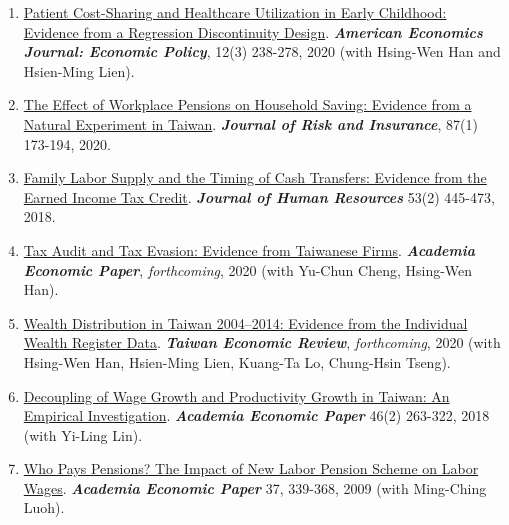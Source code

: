 \documentclass[10pt,letterpaper]{article}
\begin{document}
\begin{enumerate}[resume]

\item \href{https://www.dropbox.com/s/pe5n9a74avtwk6v/Children_copay_v176_parametric.pdf?dl=0}{Patient Cost-Sharing and Healthcare Utilization in Early Childhood: Evidence from a Regression Discontinuity Design}.
\textit{\textbf{American Economics Journal: Economic Policy}}, 12(3) 238-278, 2020 (with Hsing-Wen Han and Hsien-Ming Lien).

\item
\href{https://www.dropbox.com/s/i792d6jutss65b2/Proposal_pension_saving_JRI_v91_final.pdf?dl=0}{The Effect of Workplace Pensions on Household Saving: Evidence from a Natural Experiment in Taiwan}.
\textit{\textbf{Journal of Risk and Insurance}}, 87(1) 173-194, 2020.

\item \href{http://jhr.uwpress.org/content/early/2017/03/01/jhr.53.2.0115-6857R1.abstract}{Family Labor Supply and the Timing of Cash Transfers: Evidence from the Earned Income Tax Credit}.
\textit{\textbf{Journal of Human Resources}} 53(2) 445-473, 2018.

\item
\href{https://www.dropbox.com/s/z5b267cu72o6xlg/tot_wage_v63_olo_revised.pdf?dl=0}{Tax Audit and Tax Evasion: Evidence from Taiwanese Firms}. \textit{\textbf{Academia Economic Paper}}, \textit{forthcoming}, 2020 (with Yu-Chun Cheng, Hsing-Wen Han).

\item
\href{http://www.econ.ntu.edu.tw/ter/new/data/new/forthcoming/108-015.pdf}{Wealth Distribution in Taiwan 2004--2014: Evidence from the Individual Wealth Register Data}. \textit{\textbf{Taiwan Economic Review}}, \textit{forthcoming}, 2020 (with Hsing-Wen Han, Hsien-Ming Lien, Kuang-Ta Lo, Chung-Hsin Tseng).

\item
\href{https://www.dropbox.com/s/z5b267cu72o6xlg/tot_wage_v63_olo_revised.pdf?dl=0}{Decoupling of Wage Growth and Productivity Growth in Taiwan: An Empirical Investigation}. \textit{\textbf{Academia Economic Paper}} 46(2) 263-322, 2018 (with Yi-Ling Lin).

\item \href{http://www.econ.sinica.edu.tw/UpFiles/2013090214141704234/Periodicals_Pdf2013090215152407682/aep37-3-3.pdf}{Who Pays Pensions? The Impact of New Labor Pension Scheme on Labor Wages}.
  \textit{\textbf{Academia Economic Paper}} 37, 339-368, 2009 (with Ming-Ching Luoh).

\end{enumerate}
\end{document}
